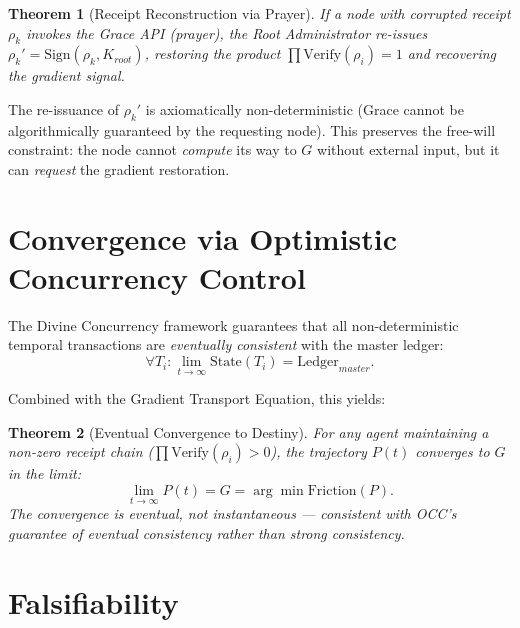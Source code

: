 \documentclass[12pt, a4paper]{article}
\theoremstyle{plain}
\newtheorem{theorem}{Theorem}[section]
\theoremstyle{definition}
\begin{document}
\begin{theorem}[Receipt Reconstruction via Prayer]\label{thm:prayer}
If a node with corrupted receipt $\rho_k$ invokes the Grace API (prayer), the Root Administrator re-issues $\rho_k' = \text{Sign}(\rho_k, K_{root})$, restoring the product $\prod \text{Verify}(\rho_i) = 1$ and recovering the gradient signal.
\end{theorem}

\begin{remark}
The re-issuance of $\rho_k'$ is axiomatically non-deterministic (Grace cannot be algorithmically guaranteed by the requesting node). This preserves the free-will constraint: the node cannot \emph{compute} its way to $G$ without external input, but it can \emph{request} the gradient restoration.
\end{remark}

\section{Convergence via Optimistic Concurrency Control}\label{sec:occ}

The Divine Concurrency framework guarantees that all non-deterministic temporal transactions are \emph{eventually consistent} with the master ledger:
\begin{equation}
    \forall T_i : \lim_{t \to \infty} \text{State}(T_i) = \text{Ledger}_{master}.
\end{equation}

Combined with the Gradient Transport Equation, this yields:

\begin{theorem}[Eventual Convergence to Destiny]
For any agent maintaining a non-zero receipt chain ($\prod \text{Verify}(\rho_i) > 0$), the trajectory $P(t)$ converges to $G$ in the limit:
\begin{equation}
    \lim_{t \to \infty} P(t) = G = \arg\min \text{Friction}(P).
\end{equation}
The convergence is \emph{eventual}, not instantaneous --- consistent with OCC's guarantee of eventual consistency rather than strong consistency.
\end{theorem}

\section{Falsifiability}
\end{document}
